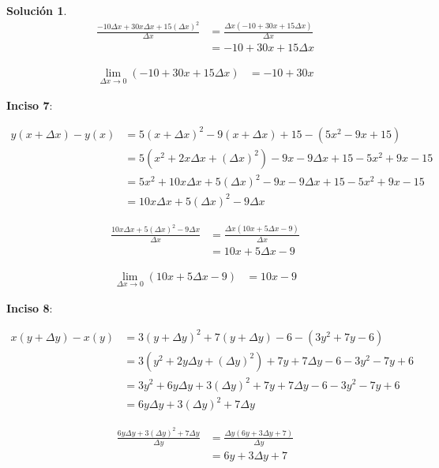 \documentclass{article}
\theoremstyle{definition}
\newtheorem*{solution}{Solución}
\begin{document}
\begin{solution}
    \begin{align*}
        \frac{-10\Delta x+30x\Delta x+15(\Delta x)^2}{\Delta x} &= \frac{\Delta x(-10+30x+15\Delta x)}{\Delta x} \\
        &= -10+30x+15\Delta x
    \end{align*}

    \begin{align*}
        \lim_{\Delta x \to 0} (-10+30x+15\Delta x) &= -10+30x
    \end{align*}

\textbf{Inciso 7}:

    \begin{align*}
        y(x+\Delta x) - y(x) &= 5(x+\Delta x)^2-9(x+\Delta x)+15-(5x^2-9x+15) \\
        &= 5(x^2+2x\Delta x+(\Delta x)^2)-9x-9\Delta x+15-5x^2+9x-15 \\
        &= 5x^2+10x\Delta x+5(\Delta x)^2-9x-9\Delta x+15-5x^2+9x-15 \\
        &= 10x\Delta x+5(\Delta x)^2-9\Delta x
    \end{align*}

    \begin{align*}
        \frac{10x\Delta x+5(\Delta x)^2-9\Delta x}{\Delta x} &= \frac{\Delta x(10x+5\Delta x-9)}{\Delta x} \\
        &= 10x+5\Delta x-9
    \end{align*}

    \begin{align*}
        \lim_{\Delta x \to 0} (10x+5\Delta x-9) &= 10x-9
    \end{align*}

\textbf{Inciso 8}:

    \begin{align*}
        x(y+\Delta y) - x(y) &= 3(y+\Delta y)^2+7(y+\Delta y)-6-(3y^2+7y-6) \\
        &= 3(y^2+2y\Delta y+(\Delta y)^2)+7y+7\Delta y-6-3y^2-7y+6 \\
        &= 3y^2+6y\Delta y+3(\Delta y)^2+7y+7\Delta y-6-3y^2-7y+6 \\
        &= 6y\Delta y+3(\Delta y)^2+7\Delta y
    \end{align*}

    \begin{align*}
        \frac{6y\Delta y+3(\Delta y)^2+7\Delta y}{\Delta y} &= \frac{\Delta y(6y+3\Delta y+7)}{\Delta y} \\
        &= 6y+3\Delta y+7
    \end{align*}


\end{solution}
\end{document}
